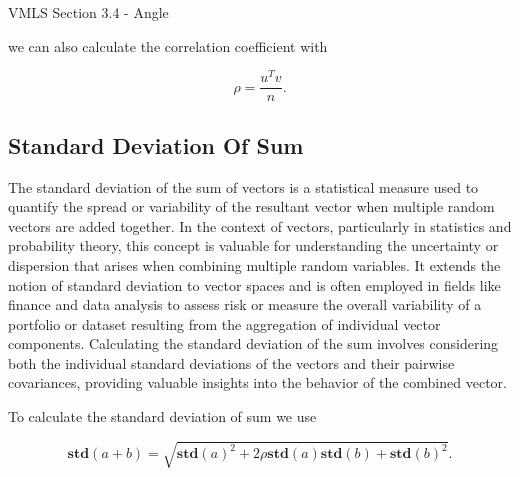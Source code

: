 \begin{notes}{VMLS Section 3.4 - Angle}
\begin{highlight}
        we can also calculate the correlation coefficient with

        \begin{equation*}
            \rho = \frac{u^{T}v}{n}.
        \end{equation*}
    \end{highlight}

    \subsection*{Standard Deviation Of Sum}

    The standard deviation of the sum of vectors is a statistical measure used to quantify the spread or variability of the resultant vector when multiple random vectors are added together. In the context of vectors, particularly 
    in statistics and probability theory, this concept is valuable for understanding the uncertainty or dispersion that arises when combining multiple random variables. It extends the notion of standard deviation to vector spaces 
    and is often employed in fields like finance and data analysis to assess risk or measure the overall variability of a portfolio or dataset resulting from the aggregation of individual vector components. Calculating the standard 
    deviation of the sum involves considering both the individual standard deviations of the vectors and their pairwise covariances, providing valuable insights into the behavior of the combined vector.

    \begin{highlight}
        To calculate the standard deviation of sum we use

        \begin{equation*}
            \mathbf{std}(a + b) = \sqrt{\mathbf{std}(a)^{2} + 2\rho\mathbf{std}(a)\mathbf{std}(b) + \mathbf{std}(b)^{2}}.
        \end{equation*}
    \end{highlight}
\end{notes}